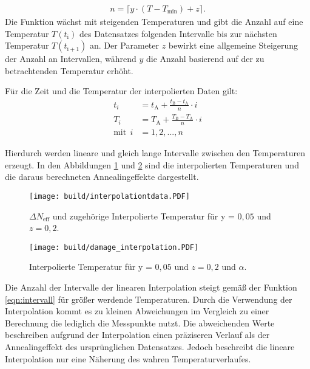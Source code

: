 \begin{align*}
  n = \lceil{y \cdot (T-T_{\mathrm{min}})+ z}\rceil \label{eqn:intervall} .
\end{align*}
Die Funktion wächst mit steigenden Temperaturen und gibt die Anzahl auf eine Temperatur $T(t_{\mathrm{i}})$ des
Datensatzes folgenden Intervalle bis zur nächsten Temperatur $T(t_{\mathrm{i+1}})$ an. Der Parameter $z$ bewirkt eine allgemeine Steigerung
der Anzahl an Intervallen, während $y$ die Anzahl basierend auf der zu betrachtenden Temperatur
erhöht.


Für die Zeit und die Temperatur der interpolierten Daten gilt:
\begin{align}
  t_i &= t_{\mathrm{A}} +  \frac{t_{\mathrm{B}}-t_{\mathrm{A}}}{n} \cdot i \\
  T_i &= T_{\mathrm{A}} +  \frac{T_{\mathrm{B}}-T_{\mathrm{A}}}{n} \cdot i \\
  \text{mit}\:\:i &= 1, 2, ..., n
\end{align}

Hierdurch werden lineare und gleich lange Intervalle zwischen den Temperaturen
erzeugt. In den Abbildungen \ref{fig:interpolation_N_eff} und \ref{fig:interpolation_damage} sind die interpolierten Temperaturen und
die daraus berechneten Annealingeffekte dargestellt.

\begin{figure}
    \texttt{[image: build/interpolationtdata.PDF]}
\caption{$\Delta N_{\mathrm{eff}}$ und zugehörige Interpolierte Temperatur für y = $0,05$ und $z=0,2$.}
\label{fig:interpolation_N_eff}
\end{figure}



\begin{figure}
  \centering
    \texttt{[image: build/damage\_interpolation.PDF]}
\caption{Interpolierte Temperatur für y = $0,05$ und $z=0,2$ und $\alpha$.}
\label{fig:interpolation_damage}
\end{figure}

Die Anzahl der Intervalle der linearen Interpolation steigt gemäß der Funktion \ref{eqn:intervall}
für größer werdende Temperaturen. Durch die Verwendung der Interpolation kommt es zu kleinen Abweichungen im
Vergleich zu einer Berechnung die lediglich die Messpunkte nutzt.
Die abweichenden Werte beschreiben
aufgrund der Interpolation einen präziseren Verlauf als der Annealingeffekt des ursprünglichen Datensatzes.
Jedoch beschreibt die lineare Interpolation nur eine Näherung des wahren Temperaturverlaufes.


